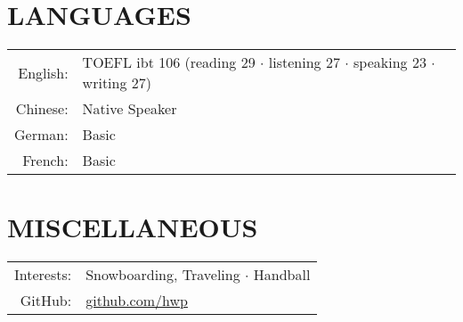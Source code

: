 \documentclass[a4paper,11pt]{article} %
\begin{document}

\section{LANGUAGES}

\begin{tabular}{rl}
  English: & TOEFL ibt 106 (reading 29 $\cdotp$ listening 27 $\cdotp$ speaking 23 $\cdotp$ writing 27) \\
  Chinese: & Native Speaker \\
  German: & Basic \\
  French: & Basic \\
\end{tabular}

\section{MISCELLANEOUS}

\begin{tabular}{rl}
  Interests: & Snowboarding, Traveling $\cdotp$ Handball \\
  GitHub: & \href{https://github.com/hwp}{github.com/hwp} \\
\end{tabular}
\end{document}
